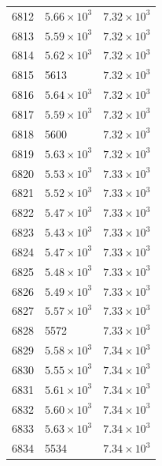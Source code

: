\begin{table}[H]
\begin{tabular}{lll}
6812 & $\displaystyle 5.66 \times 10^{3}$ & $\displaystyle 7.32 \times 10^{3}$ \\
6813 & $\displaystyle 5.59 \times 10^{3}$ & $\displaystyle 7.32 \times 10^{3}$ \\
6814 & $\displaystyle 5.62 \times 10^{3}$ & $\displaystyle 7.32 \times 10^{3}$ \\
6815 & 5613 & $\displaystyle 7.32 \times 10^{3}$ \\
6816 & $\displaystyle 5.64 \times 10^{3}$ & $\displaystyle 7.32 \times 10^{3}$ \\
6817 & $\displaystyle 5.59 \times 10^{3}$ & $\displaystyle 7.32 \times 10^{3}$ \\
6818 & 5600 & $\displaystyle 7.32 \times 10^{3}$ \\
6819 & $\displaystyle 5.63 \times 10^{3}$ & $\displaystyle 7.32 \times 10^{3}$ \\
6820 & $\displaystyle 5.53 \times 10^{3}$ & $\displaystyle 7.33 \times 10^{3}$ \\
6821 & $\displaystyle 5.52 \times 10^{3}$ & $\displaystyle 7.33 \times 10^{3}$ \\
6822 & $\displaystyle 5.47 \times 10^{3}$ & $\displaystyle 7.33 \times 10^{3}$ \\
6823 & $\displaystyle 5.43 \times 10^{3}$ & $\displaystyle 7.33 \times 10^{3}$ \\
6824 & $\displaystyle 5.47 \times 10^{3}$ & $\displaystyle 7.33 \times 10^{3}$ \\
6825 & $\displaystyle 5.48 \times 10^{3}$ & $\displaystyle 7.33 \times 10^{3}$ \\
6826 & $\displaystyle 5.49 \times 10^{3}$ & $\displaystyle 7.33 \times 10^{3}$ \\
6827 & $\displaystyle 5.57 \times 10^{3}$ & $\displaystyle 7.33 \times 10^{3}$ \\
6828 & 5572 & $\displaystyle 7.33 \times 10^{3}$ \\
6829 & $\displaystyle 5.58 \times 10^{3}$ & $\displaystyle 7.34 \times 10^{3}$ \\
6830 & $\displaystyle 5.55 \times 10^{3}$ & $\displaystyle 7.34 \times 10^{3}$ \\
6831 & $\displaystyle 5.61 \times 10^{3}$ & $\displaystyle 7.34 \times 10^{3}$ \\
6832 & $\displaystyle 5.60 \times 10^{3}$ & $\displaystyle 7.34 \times 10^{3}$ \\
6833 & $\displaystyle 5.63 \times 10^{3}$ & $\displaystyle 7.34 \times 10^{3}$ \\
6834 & 5534 & $\displaystyle 7.34 \times 10^{3}$ \\

\end{tabular}
\end{table}
